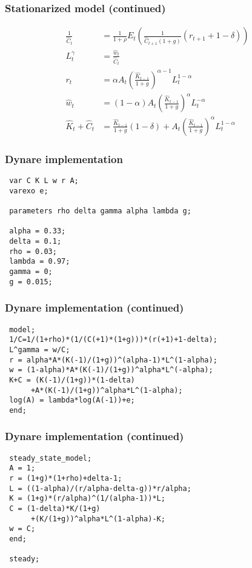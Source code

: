 \documentclass{beamer}
\begin{document}
\begin{frame}
  \frametitle{Stationarized model (continued)}
  \begin{align*}
    \frac{1}{\widehat{C}_t}&=\frac{1}{1+\rho}E_t\left(\frac{1}{\widehat{C}_{t+1}(1+g)}(r_{t+1}+1-\delta)\right)\\
    L_t^\gamma&=\frac{\widehat{w}_t}{\widehat{C}_t}\\
    r_t &= \alpha A_t\left(\frac{\widehat{K}_{t-1}}{1+g}\right)^{\alpha-1}L_t^{1-\alpha}\\
    \widehat{w}_t &= (1-\alpha) A_t\left(\frac{\widehat{K}_{t-1}}{1+g}\right)^\alpha L_t^{-\alpha}\\
    \widehat{K}_t+\widehat{C}_t &= \frac{\widehat{K}_{t-1}}{1+g}(1-\delta)+A_t\left(\frac{\widehat{K}_{t-1}}{1+g}\right)^\alpha L_t^{1-\alpha}
  \end{align*}    
\end{frame}

\begin{frame}[fragile]
  \frametitle{Dynare implementation}
\begin{verbatim}
 var C K L w r A;
 varexo e;

 parameters rho delta gamma alpha lambda g;

 alpha = 0.33;
 delta = 0.1;
 rho = 0.03;
 lambda = 0.97;
 gamma = 0;
 g = 0.015;
\end{verbatim}
\end{frame}

\begin{frame}[fragile]
\frametitle{Dynare implementation (continued)}
\begin{verbatim}
 model;
 1/C=1/(1+rho)*(1/(C(+1)*(1+g)))*(r(+1)+1-delta);
 L^gamma = w/C;
 r = alpha*A*(K(-1)/(1+g))^(alpha-1)*L^(1-alpha);
 w = (1-alpha)*A*(K(-1)/(1+g))^alpha*L^(-alpha);
 K+C = (K(-1)/(1+g))*(1-delta)
      +A*(K(-1)/(1+g))^alpha*L^(1-alpha);
 log(A) = lambda*log(A(-1))+e;
 end;
\end{verbatim}
\end{frame}

\begin{frame}[fragile]
\frametitle{Dynare implementation (continued)}
\begin{verbatim}
 steady_state_model;
 A = 1;
 r = (1+g)*(1+rho)+delta-1;
 L = ((1-alpha)/(r/alpha-delta-g))*r/alpha;
 K = (1+g)*(r/alpha)^(1/(alpha-1))*L;
 C = (1-delta)*K/(1+g)
      +(K/(1+g))^alpha*L^(1-alpha)-K;
 w = C;
 end;

 steady;
\end{verbatim}
\end{frame}
\end{document}
